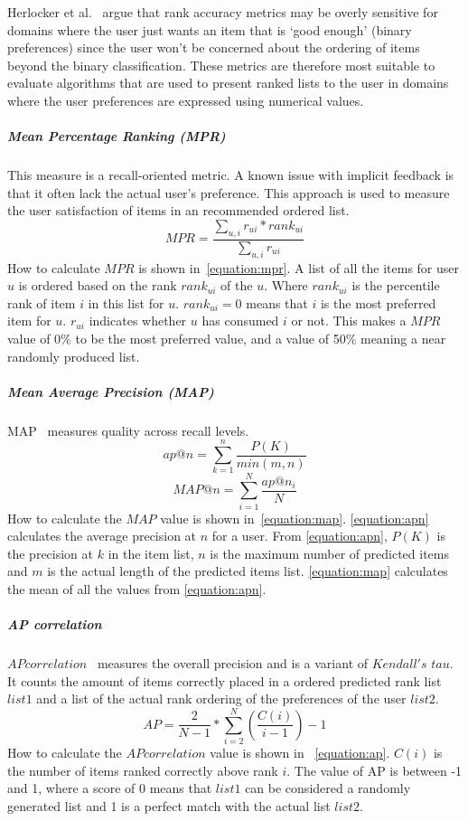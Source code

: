 Herlocker et al.~\cite{Herlocker2004} argue that rank accuracy metrics may be
overly sensitive for domains where the user just wants an item that is `good
enough' (binary preferences) since the user won't be concerned about the
ordering of items beyond the binary classification. These metrics are therefore
most suitable to evaluate algorithms that are used to present ranked lists to
the user in domains where the user preferences are expressed using numerical
values.

\subparagraph{Mean Percentage Ranking (MPR)}
\label{subp:mean_percentage_ranking_}
This measure is a recall-oriented metric.
A known issue with implicit feedback is that it often lack the actual user's preference.
This approach is used to measure the user satisfaction of items in an recommended ordered list.
\begin{equation}
	MPR = \frac{\sum_{u,i}{r_{ui} * rank_{ui}}}{\sum_{u,i}{r_{ui}}}
	\label{equation:mpr}
\end{equation}
How to calculate $MPR$ is shown in~\ref{equation:mpr}.
A list of all the items for user $u$ is ordered based on the rank $rank_{ui}$ of the $u$.
Where $rank_{ui}$ is the percentile rank of item $i$ in this list for $u$.
$rank_{ui} = 0$ means that $i$ is the most preferred item for $u$.
$r_{ui}$ indicates whether $u$ has consumed $i$ or not.
This makes a $MPR$ value of 0\% to be the most preferred value, and a value of 50\% meaning a near randomly produced list.

\subparagraph{Mean Average Precision (MAP)}
\label{subp:mean_average_precision_map_}
MAP~\cite{Manning:2008:IIR:1394399} measures quality across recall levels.
\begin{equation}
	ap@n = \sum_{k=1}^{n}{\frac{P(K)}{min(m,n)}}
	\label{equation:apn}
\end{equation}
\begin{equation}
	MAP@n = \sum_{i=1}^{N}{\frac{ap@n_i}{N}}
	\label{equation:map}
\end{equation}
How to calculate the $MAP$ value is shown in~\ref{equation:map}.
\ref{equation:apn} calculates the average precision at $n$ for a user.
From \ref{equation:apn}, $P(K)$ is the precision at $k$ in the item list, $n$ is the maximum number of predicted items and $m$ is the actual length of the predicted items list.
\ref{equation:map} calculates the mean of all the values from \ref{equation:apn}.


\subparagraph{AP correlation}
\label{subp:ap_correlation}
$AP correlation$~\cite{Yilmaz:2008:NRC:1390334.1390435} measures the overall precision and is a variant of $Kendall's$ $tau$.
It counts the amount of items correctly placed in a ordered predicted rank list $list1$ and a list of the actual rank ordering of the preferences of the user $list2$.
\begin{equation}
	AP = \frac{2}{N - 1} * \sum_{i=2}^{N}{(\frac{C(i)}{i - 1})} - 1
	\label{equation:ap}
\end{equation}
How to calculate the $AP correlation$ value is shown in ~\ref{equation:ap}.
$C(i)$ is the number of items ranked correctly above rank $i$.
The value of AP is between -1 and 1, where a score of 0 means that $list1$ can be considered a randomly generated list and 1 is a perfect match with the actual list $list2$.

